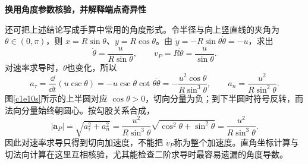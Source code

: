 \begin{solution}


\par\medskip{}\noindent\textbf{换用角度参数核验，并解释端点奇异性}\par\nobreak
还可把上述结论写成手算中常用的角度形式。令半径与向上竖直线的夹角为 $\theta\in(0,\pi)$，则 $x=R\sin\theta$、$y=R\cos\theta$。由 $\dot y=-R\sin\theta\dot\theta=-u$，求出
\[\dot\theta=\frac{u}{R\sin\theta},\qquad
v_P=R\dot\theta=\frac{u}{\sin\theta}.\]
对速率求导时，$\theta$也变化，所以
\[a_\tau=\frac{\dd}{\dd t}(u\csc\theta)
 =-u\csc\theta\cot\theta\dot\theta
 =-\frac{u^2\cos\theta}{R\sin^3\theta},\qquad
a_n=\frac{u^2}{R\sin^2\theta}.\]
图\ref{c1e10s}所示的上半圆对应 $\cos\theta>0$，切向分量为负；到下半圆时符号反转，而法向分量始终朝圆心。按勾股关系合成，
\[|\bm a_P|=\sqrt{a_\tau^2+a_n^2}
 =\frac{u^2}{R\sin^3\theta}\sqrt{\cos^2\theta+\sin^2\theta}
 =\frac{u^2}{R\sin^3\theta}.\]
因此对速率求导只得到切向加速度，不能把 $\dot v_P$称为整个加速度。直角坐标计算与切法向计算在这里互相核验，尤其能检查二阶求导时最容易遗漏的角度导数。
\end{solution}
